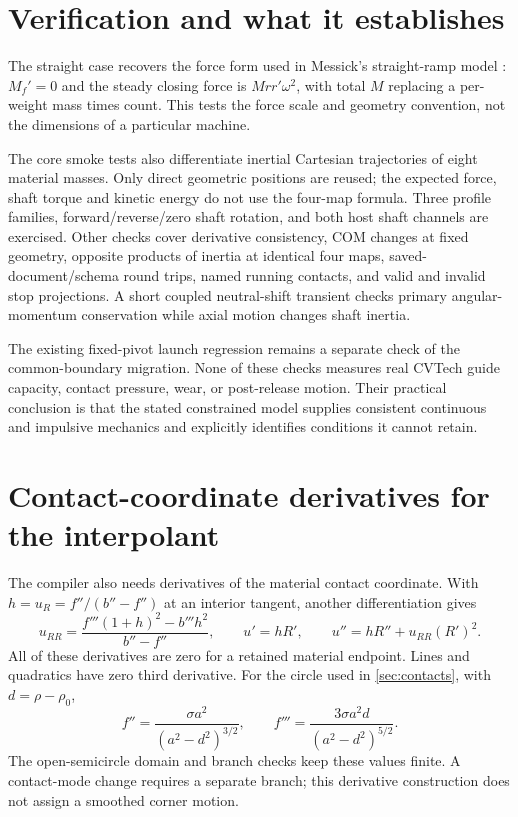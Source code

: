 \documentclass[11pt,letterpaper]{article}
\numberwithin{equation}{section}
\begin{document}
\section{Verification and what it establishes}

The straight case recovers the force form used in Messick's straight-ramp
model \cite{messick}: $M_f'=0$ and the steady closing force is $Mr r'\omega^2$,
with total $M$ replacing a per-weight mass times count. This tests the force
scale and geometry convention, not the dimensions of a particular machine.

The core smoke tests also differentiate inertial Cartesian trajectories of
eight material masses. Only direct geometric positions are reused; the
expected force, shaft torque and kinetic energy do not use the four-map
formula. Three profile families, forward/reverse/zero shaft rotation, and both
host shaft channels are exercised. Other checks cover derivative consistency,
COM changes at fixed geometry, opposite products of inertia at identical four
maps, saved-document/schema round trips, named running contacts, and valid and
invalid stop projections. A short coupled neutral-shift transient checks
primary angular-momentum conservation while axial motion changes shaft inertia.

The existing fixed-pivot launch regression remains a separate check of the
common-boundary migration. None of these checks measures real CVTech guide
capacity, contact pressure, wear, or post-release motion. Their practical
conclusion is that the stated constrained model supplies consistent continuous
and impulsive mechanics and explicitly identifies conditions it cannot retain.

\appendix
\section{Contact-coordinate derivatives for the interpolant}

The compiler also needs derivatives of the material contact coordinate. With
$h=u_R=f''/(b''-f'')$ at an interior tangent, another differentiation gives
\begin{equation}
 u_{RR}=\frac{f'''(1+h)^2-b'''h^2}{b''-f''},\qquad
 u'=hR',\qquad u''=hR''+u_{RR}(R')^2.
\end{equation}
All of these derivatives are zero for a retained material endpoint. Lines and
quadratics have zero third derivative. For the circle used in
\cref{sec:contacts}, with $d=\rho-\rho_0$,
\begin{equation}
 f''=\frac{\sigma a^2}{(a^2-d^2)^{3/2}},\qquad
 f'''=\frac{3\sigma a^2d}{(a^2-d^2)^{5/2}}.
\end{equation}
The open-semicircle domain and branch checks keep these values finite. A
contact-mode change requires a separate branch; this derivative construction
does not assign a smoothed corner motion.
\end{document}
